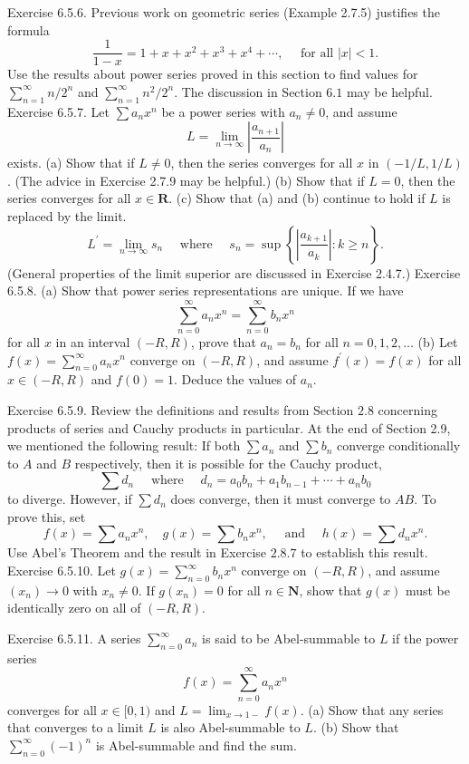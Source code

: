 Exercise 6.5.6. Previous work on geometric series (Example 2.7.5) justifies the formula
$$
\frac{1}{1-x}=1+x+x^{2}+x^{3}+x^{4}+\cdots, \quad \text { for all }|x|<1 .
$$
Use the results about power series proved in this section to find values for $\sum_{n=1}^{\infty} n / 2^{n}$ and $\sum_{n=1}^{\infty} n^{2} / 2^{n}$. The discussion in Section $6.1$ may be helpful.
Exercise 6.5.7. Let $\sum a_{n} x^{n}$ be a power series with $a_{n} \neq 0$, and assume
$$
L=\lim _{n \rightarrow \infty}\left|\frac{a_{n+1}}{a_{n}}\right|
$$
exists.
(a) Show that if $L \neq 0$, then the series converges for all $x$ in $(-1 / L, 1 / L)$. (The advice in Exercise 2.7.9 may be helpful.)
(b) Show that if $L=0$, then the series converges for all $x \in \mathbf{R}$.
(c) Show that (a) and (b) continue to hold if $L$ is replaced by the limit.
$$
L^{\prime}=\lim _{n \rightarrow \infty} s_{n} \quad \text { where } \quad s_{n}=\sup \left\{\left|\frac{a_{k+1}}{a_{k}}\right|: k \geq n\right\} .
$$
(General properties of the limit superior are discussed in Exercise 2.4.7.)
Exercise 6.5.8. (a) Show that power series representations are unique. If we have
$$
\sum_{n=0}^{\infty} a_{n} x^{n}=\sum_{n=0}^{\infty} b_{n} x^{n}
$$
for all $x$ in an interval $(-R, R)$, prove that $a_{n}=b_{n}$ for all $n=0,1,2, \ldots$
(b) Let $f(x)=\sum_{n=0}^{\infty} a_{n} x^{n}$ converge on $(-R, R)$, and assume $f^{\prime}(x)=f(x)$ for all $x \in(-R, R)$ and $f(0)=1$. Deduce the values of $a_{n}$.

Exercise 6.5.9. Review the definitions and results from Section $2.8$ concerning products of series and Cauchy products in particular. At the end of Section 2.9, we mentioned the following result: If both $\sum a_{n}$ and $\sum b_{n}$ converge conditionally to $A$ and $B$ respectively, then it is possible for the Cauchy product,
$$
\sum d_{n} \quad \text { where } \quad d_{n}=a_{0} b_{n}+a_{1} b_{n-1}+\cdots+a_{n} b_{0}
$$
to diverge. However, if $\sum d_{n}$ does converge, then it must converge to $A B$. To prove this, set
$$
f(x)=\sum a_{n} x^{n}, \quad g(x)=\sum b_{n} x^{n}, \quad \text { and } \quad h(x)=\sum d_{n} x^{n} .
$$
Use Abel's Theorem and the result in Exercise $2.8 .7$ to establish this result.
Exercise 6.5.10. Let $g(x)=\sum_{n=0}^{\infty} b_{n} x^{n}$ converge on $(-R, R)$, and assume $\left(x_{n}\right) \rightarrow 0$ with $x_{n} \neq 0$. If $g\left(x_{n}\right)=0$ for all $n \in \mathbf{N}$, show that $g(x)$ must be identically zero on all of $(-R, R)$.

Exercise 6.5.11. A series $\sum_{n=0}^{\infty} a_{n}$ is said to be Abel-summable to $L$ if the power series
$$
f(x)=\sum_{n=0}^{\infty} a_{n} x^{n}
$$
converges for all $x \in[0,1)$ and $L=\lim _{x \rightarrow 1-} f(x)$.
(a) Show that any series that converges to a limit $L$ is also Abel-summable to $L$.
(b) Show that $\sum_{n=0}^{\infty}(-1)^{n}$ is Abel-summable and find the sum.
